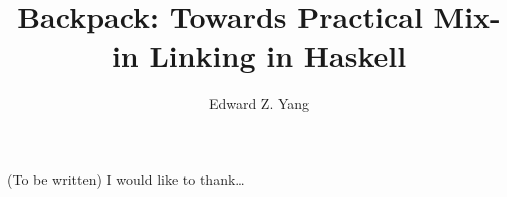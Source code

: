 \documentclass{report}
\begin{document}
\title{Backpack: Towards Practical Mix-in Linking in Haskell}
\author{Edward Z. Yang}

\beforepreface%
    (To be written)
    I would like to thank\ldots
\afterpreface%













\end{document}
